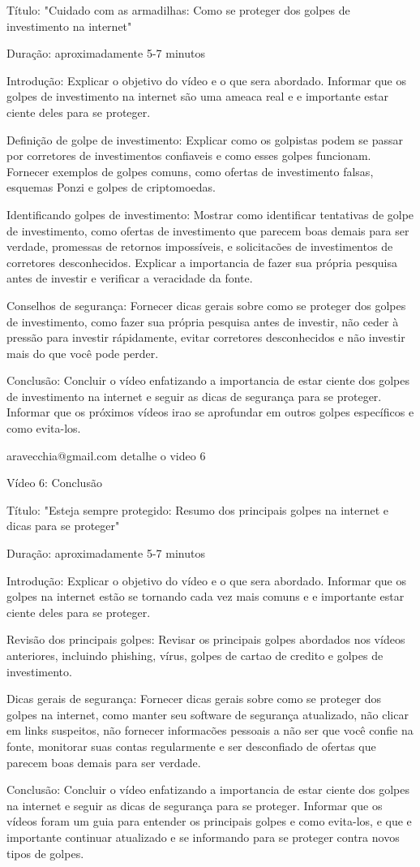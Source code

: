 Título: "Cuidado com as armadilhas: Como se proteger dos golpes de investimento na internet"

Duração: aproximadamente 5-7 minutos

Introdução: Explicar o objetivo do vídeo e o que sera abordado. Informar que os golpes de investimento na internet são uma ameaca real e e importante estar ciente deles para se proteger.

Definição de golpe de investimento: Explicar como os golpistas podem se passar por corretores de investimentos confiaveis e como esses golpes funcionam. Fornecer exemplos de golpes comuns, como ofertas de investimento falsas, esquemas Ponzi e golpes de criptomoedas.

Identificando golpes de investimento: Mostrar como identificar tentativas de golpe de investimento, como ofertas de investimento que parecem boas demais para ser verdade, promessas de retornos impossíveis, e solicitacões de investimentos de corretores desconhecidos. Explicar a importancia de fazer sua própria pesquisa antes de investir e verificar a veracidade da fonte.

Conselhos de segurança: Fornecer dicas gerais sobre como se proteger dos golpes de investimento, como fazer sua própria pesquisa antes de investir, não ceder à pressão para investir rápidamente, evitar corretores desconhecidos e não investir mais do que você pode perder.

Conclusão: Concluir o vídeo enfatizando a importancia de estar ciente dos golpes de investimento na internet e seguir as dicas de segurança para se proteger. Informar que os próximos vídeos irao se aprofundar em outros golpes específicos e como evita-los.

aravecchia@gmail.com
detalhe o video 6

Vídeo 6: Conclusão

Título: "Esteja sempre protegido: Resumo dos principais golpes na internet e dicas para se proteger"

Duração: aproximadamente 5-7 minutos

Introdução: Explicar o objetivo do vídeo e o que sera abordado. Informar que os golpes na internet estão se tornando cada vez mais comuns e e importante estar ciente deles para se proteger.

Revisão dos principais golpes: Revisar os principais golpes abordados nos vídeos anteriores, incluindo phishing, vírus, golpes de cartao de credito e golpes de investimento.

Dicas gerais de segurança: Fornecer dicas gerais sobre como se proteger dos golpes na internet, como manter seu software de segurança atualizado, não clicar em links suspeitos, não fornecer informacões pessoais a não ser que você confie na fonte, monitorar suas contas regularmente e ser desconfiado de ofertas que parecem boas demais para ser verdade.

Conclusão: Concluir o vídeo enfatizando a importancia de estar ciente dos golpes na internet e seguir as dicas de segurança para se proteger. Informar que os vídeos foram um guia para entender os principais golpes e como evita-los, e que e importante continuar atualizado e se informando para se proteger contra novos tipos de golpes.
